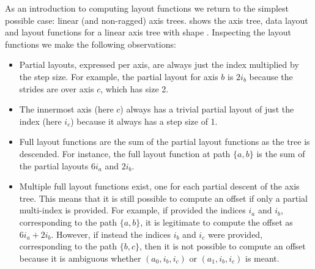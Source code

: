 \documentclass[thesis]{subfiles}
\begin{document}
As an introduction to computing layout functions we return to the simplest possible case: linear (and non-ragged) axis trees.
 shows the axis tree, data layout and layout functions for a linear axis tree with shape .
Inspecting the layout functions we make the following observations:
\begin{itemize}
  \item
    Partial layouts, expressed per axis, are always just the index multiplied by the step size.
    For example, the partial layout for axis $b$ is $2 i_b$ because the strides are over axis $c$, which has size 2.
  \item
    The innermost axis (here $c$) always has a trivial partial layout of just the index (here $i_c$) because it always has a step size of 1.
  \item
    Full layout functions are the sum of the partial layout functions as the tree is descended.
    For instance, the full layout function at path $\{a,b\}$ is the sum of the partial layouts $6 i_a$ and $2 i_b$.

  \item
    Multiple full layout functions exist, one for each partial descent of the axis tree.
    This means that it is still possible to compute an offset if only a partial multi-index is provided.
    For example, if provided the indices $i_a$ and $i_b$, corresponding to the path $\{a,b\}$, it is legitimate to compute the offset as $6i_a+2i_b$.
    However, if instead the indices $i_b$ and $i_c$ were provided, corresponding to the path $\{b,c\}$, then it is not possible to compute an offset because it is ambiguous whether $(a_0, i_b, i_c)$ or $(a_1, i_b, i_c)$ is meant.
\end{itemize}
\end{document}
